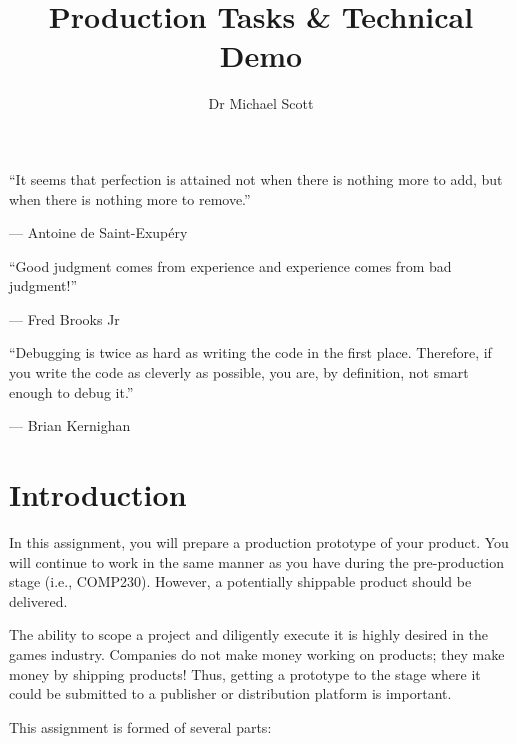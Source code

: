 \documentclass{../fal_assignment}
\title{Production Tasks \& Technical Demo}
\author{Dr Michael Scott}
\begin{document}
\maketitle

\begin{marginquote}
    ``It seems that perfection is attained not when there is nothing more to add,
        but when there is nothing more to remove.''
    
    --- Antoine de Saint-Exup\'ery
    
    \marginquoterule
    
    ``Good judgment comes from experience and experience comes from bad judgment!''
    
    --- Fred Brooks Jr
    
    \marginquoterule
    
    ``Debugging is twice as hard as writing the code in the first place.
     Therefore, if you write the code as cleverly as possible, you are, by definition, not smart enough to debug it.'' 
 
         --- Brian Kernighan
     
\end{marginquote}

\section*{Introduction}

In this assignment, you will prepare a production prototype of your product. You will continue to work in the same manner as you have during the pre-production stage (i.e., COMP230). However, a potentially shippable product should be delivered.

The ability to scope a project and diligently execute it is highly desired in the games industry. Companies do not make money working on products; they make money by shipping products! Thus, getting a prototype to the stage where it could be submitted to a publisher or distribution platform is important. 

This assignment is formed of several parts:
\end{document}
